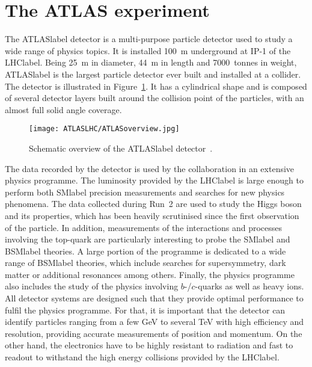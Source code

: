\section{The ATLAS experiment}

The \acrshort{ATLASlabel} detector is a multi-purpose particle detector used to study a wide range of physics topics. It is installed 100~m underground at IP-1 of the \acrshort{LHClabel}. Being 25~m in diameter, 44~m in length and 7000~tonnes in weight, \acrshort{ATLASlabel} is the largest particle detector ever built and installed at a collider. The detector is illustrated in Figure~\ref{figLHC:ATLAS}. It has a cylindrical shape and is composed of several detector layers built around the collision point of the particles, with an almost full solid angle coverage.\\

\begin{figure}[htbp]
    \RawFloats
    \begin{center}
    \texttt{[image: ATLASLHC/ATLASoverview.jpg]}
    \caption{
        Schematic overview of the \acrshort{ATLASlabel} detector~\cite{Collaboration_2008}. 
    }
    \label{figLHC:ATLAS}
    \end{center}
\end{figure}

The data recorded by the detector is used by the collaboration in an extensive physics programme. The luminosity provided by the \acrshort{LHClabel} is large enough to perform both \acrshort{SMlabel} precision measurements and searches for new physics phenomena. The data collected during Run~2 are used to study the Higgs boson and its properties, which has been heavily scrutinised since the first observation of the particle. In addition, measurements of the interactions and processes involving the top-quark are particularly interesting to probe the \acrshort{SMlabel} and \acrshort{BSMlabel} theories. A large portion of the programme is dedicated to a wide range of \acrshort{BSMlabel} theories, which include searches for supersymmetry, dark matter or additional resonances among others. Finally, the physics programme also includes the study of the physics involving $b$-/$c$-quarks as well as heavy ions.\\

All detector systems are designed such that they provide optimal performance to fulfil the physics programme. For that, it is important that the detector can identify particles ranging from a few GeV to several TeV with high efficiency and resolution, providing accurate measurements of position and momentum. On the other hand, the electronics have to be highly resistant to radiation and fast to readout to withstand the high energy collisions provided by the \acrshort{LHClabel}.\\

